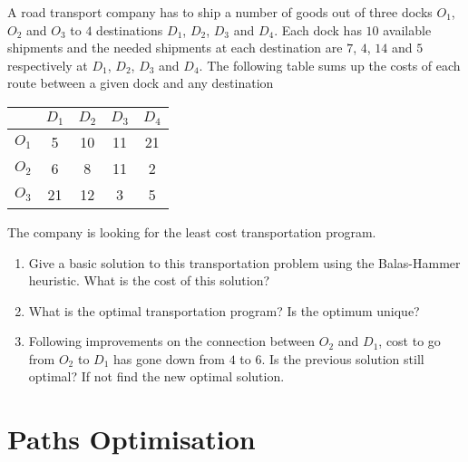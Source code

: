 \documentclass[11pt,a4paper]{article}
\begin{document}
\begin{question}[subtitle={Transportation Program}]
  A road transport company has to ship a number of goods out of three
  docks $O_1$, $O_2$ and $O_3$ to $4$ destinations $D_1$, $D_2$, $D_3$
  and $D_4$. Each dock has $10$ available shipments and the needed
  shipments at each destination are $7$, $4$, $14$ and $5$
  respectively at $D_1$, $D_2$, $D_3$ and $D_4$. The following table
  sums up the costs of each route between a given dock and any
  destination
  \begin{center}
    \renewcommand{\arraystretch}{1.5}
    \begin{tabular}{c|c|c|c|c}
      & $D_1$ & $D_2$ & $D_3$ & $D_4$ \\
      \hline
      $O_1$ & 5 & 10 & 11 & 21 \\
      \hline
      $O_2$ & 6 & 8 & 11 & 2 \\
      \hline
      $O_3$ & 21 & 12 & 3 & 5 \\
    \end{tabular}
  \end{center}
  The company is looking for the least cost transportation program.
  \begin{enumerate}
  \item Give a basic solution to this transportation problem using the
    Balas-Hammer heuristic. What is the cost of this solution?
  \item What is the optimal transportation program? Is the optimum unique?
  \item Following improvements on the connection between $O_2$ and
    $D_1$, cost to go from $O_2$ to $D_1$ has gone down from $4$ to
    $6$. Is the previous solution still optimal? If not find the new
    optimal solution.
  \end{enumerate}
\end{question}

\section{Paths Optimisation}
\end{document}
